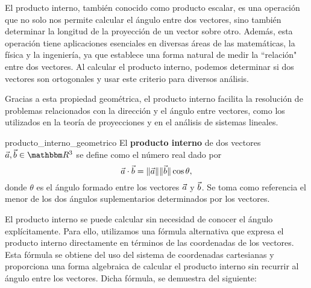 El producto interno, también conocido como producto escalar, es una operación que no solo nos permite calcular el ángulo entre dos vectores, sino también determinar la longitud de la proyección de un vector sobre otro. Además, esta operación tiene aplicaciones esenciales en diversas áreas de las matemáticas, la física y la ingeniería, ya que establece una forma natural de medir la ``relación" entre dos vectores. Al calcular el producto interno, podemos determinar si dos vectores son ortogonales y usar este criterio para diversos análisis.

Gracias a esta propiedad geométrica, el producto interno facilita la resolución de problemas relacionados con la dirección y el ángulo entre vectores, como los utilizados en la teoría de proyecciones y en el análisis de sistemas lineales.

\begin{definition}{}{producto_interno_geometrico}
    El \textbf{producto interno} de dos vectores $\veca, \vecb \in \RR[3]$ se define como el número real dado por
    $$\vec{a} \cdot \vec{b} = \|\vec{a}\| \|\vec{b}\| \cos\theta,$$
    donde $\theta$ es el ángulo formado entre los vectores $\vec{a}$ y $\vec{b}$. Se toma como referencia el menor de los dos ángulos suplementarios determinados por los vectores.
\end{definition}

El producto interno se puede calcular sin necesidad de conocer el ángulo explícitamente. Para ello, utilizamos una fórmula alternativa que expresa el producto interno directamente en términos de las coordenadas de los vectores. Esta fórmula se obtiene del uso del sistema de coordenadas cartesianas y proporciona una forma algebraica de calcular el producto interno sin recurrir al ángulo entre los vectores. Dicha fórmula, se demuestra del siguiente:

